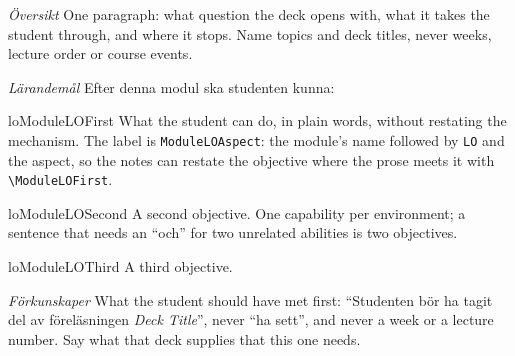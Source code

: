%

\emph{Översikt}
One paragraph: what question the deck opens with, what it takes the
student through, and where it stops.  Name topics and deck titles, never
weeks, lecture order or course events.

\emph{Lärandemål}
Efter denna modul ska studenten kunna:
\begin{restatable}{lo}{ModuleLOFirst}\label{ModuleLOFirst}%
  What the student can do, in plain words, without restating the
  mechanism.  The label is \texttt{ModuleLOAspect}: the module's name
  followed by \texttt{LO} and the aspect, so the notes can restate the
  objective where the prose meets it with
  \texttt{\textbackslash ModuleLOFirst}.
\end{restatable}
\begin{restatable}{lo}{ModuleLOSecond}\label{ModuleLOSecond}%
  A second objective.  One capability per environment; a sentence that
  needs an \enquote{och} for two unrelated abilities is two objectives.
\end{restatable}
\begin{restatable}{lo}{ModuleLOThird}\label{ModuleLOThird}%
  A third objective.
\end{restatable}

\emph{Förkunskaper}
What the student should have met first: \enquote{Studenten bör ha tagit del av
föreläsningen \emph{Deck Title}}, never \enquote{ha sett}, and never a week or
a lecture number.  Say what that deck supplies that this one needs.
